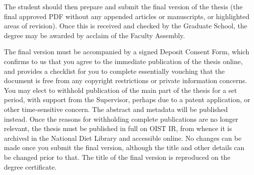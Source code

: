 The student should then prepare and submit the final version of the thesis (the final approved PDF without any appended articles or manuscripts, or highlighted areas of revision).  Once this is received and checked by the Graduate School, the degree may be awarded by acclaim of the Faculty Assembly.

The final version must be accompanied by a signed Deposit Consent Form, which confirms to us that you agree to the immediate publication of the thesis online, and provides a checklist for you to complete essentially vouching that the document is free from any copyright restrictions or private information concerns.  You may elect to withhold publication of the main part of the thesis for a set period, with support from the Supervisor, perhaps due to a patent application, or other time-sensitive concern.  The abstract and metadata will be published instead.  Once the reasons for withholding complete publications are no longer relevant, the thesis must be published in full on OIST IR, from whence it is archived in the National Diet Library and accessible online.  No changes can be made once you submit the final version, although the title and other details can be changed prior to that.  The title of the final version is reproduced on the degree certificate. 

